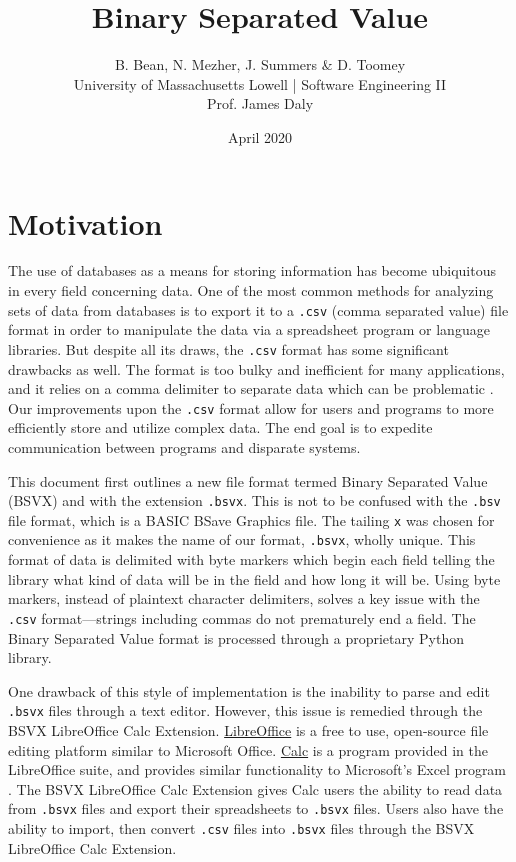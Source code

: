 \documentclass[10pt]{article}
\begin{document}
\title{Binary Separated Value}
\author{B. Bean, N. Mezher, J. Summers \& D. Toomey\\University of Massachusetts Lowell | Software Engineering II\\Prof. James Daly}
\date{April 2020}
\maketitle

\section*{Motivation}

The use of databases as a means for storing information has become ubiquitous in every field concerning data.
One of the most common methods for analyzing sets of data from databases is to export it to a \texttt{.csv} (comma separated value) file format in order to manipulate the data via a spreadsheet program or language libraries.
But despite all its draws, the \texttt{.csv} format has some significant drawbacks as well.
The format is too bulky and inefficient for many applications, and it relies on a comma delimiter to separate data which can be problematic \cite{Coleman2011}.
Our improvements upon the \texttt{.csv} format allow for users and programs to more efficiently store and utilize complex data.
The end goal is to expedite communication between programs and disparate systems.

\indent{}
This document first outlines a new file format termed Binary Separated Value (BSVX) and with the extension \texttt{.bsvx}.
This is not to be confused with the \texttt{.bsv} file format, which is a BASIC BSave Graphics file.
The tailing \texttt{x} was chosen for convenience as it makes the name of our format, \texttt{.bsvx}, wholly unique.
This format of data is delimited with byte markers which begin each field telling the library what kind of data will be in the field and how long it will be.
Using byte markers, instead of plaintext character delimiters, solves a key issue with the \texttt{.csv} format---strings including commas do not prematurely end a field.
The Binary Separated Value format is processed through a proprietary Python library.

\indent{}
One drawback of this style of implementation is the inability to parse and edit \texttt{.bsvx} files through a text editor.
However, this issue is remedied through the BSVX LibreOffice Calc Extension.
\href{https://www.libreoffice.org/discover/libreoffice/}{LibreOffice} is a free to use, open-source file editing platform similar to Microsoft Office.
\href{https://www.libreoffice.org/discover/calc/}{Calc} is a program provided in the LibreOffice suite, and provides similar functionality to Microsoft’s Excel program \cite{Guthrie2012}.
The BSVX LibreOffice Calc Extension gives Calc users the ability to read data from \texttt{.bsvx} files and export their spreadsheets to \texttt{.bsvx} files.
Users also have the ability to import, then convert \texttt{.csv} files into \texttt{.bsvx} files through the BSVX LibreOffice Calc Extension.
\end{document}
